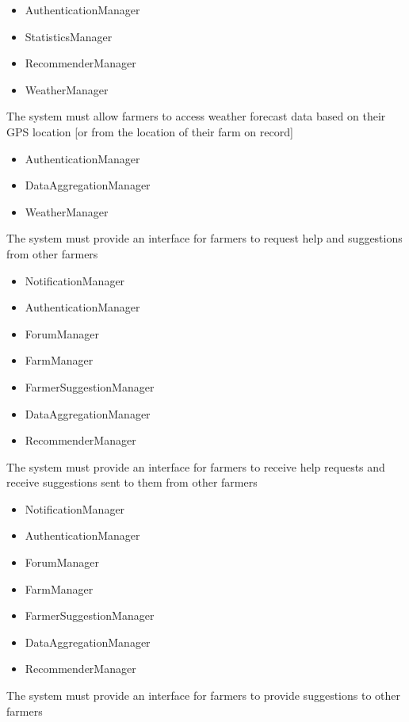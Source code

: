 \begin{itemize}
\begin{itemize}
\item AuthenticationManager
\item StatisticsManager
\item RecommenderManager
\item WeatherManager

\end{itemize}

 The system must allow farmers to access weather forecast data based on their GPS location [or from the location of their farm on record]

\begin{itemize}

\item AuthenticationManager
\item DataAggregationManager
\item WeatherManager

\end{itemize}

 The system must provide an interface for farmers to request help and suggestions from other farmers
\begin{itemize}

\item NotificationManager
\item AuthenticationManager
\item ForumManager
\item FarmManager
\item FarmerSuggestionManager
\item DataAggregationManager
\item RecommenderManager

\end{itemize}
 The system must provide an interface for farmers to receive help requests and receive suggestions sent to them from other farmers
\begin{itemize}

\item NotificationManager
\item AuthenticationManager
\item ForumManager
\item FarmManager
\item FarmerSuggestionManager
\item DataAggregationManager
\item RecommenderManager


\end{itemize}
 The system must provide an interface for farmers to provide suggestions to other farmers
\begin{itemize}


\end{itemize}
\end{itemize}

